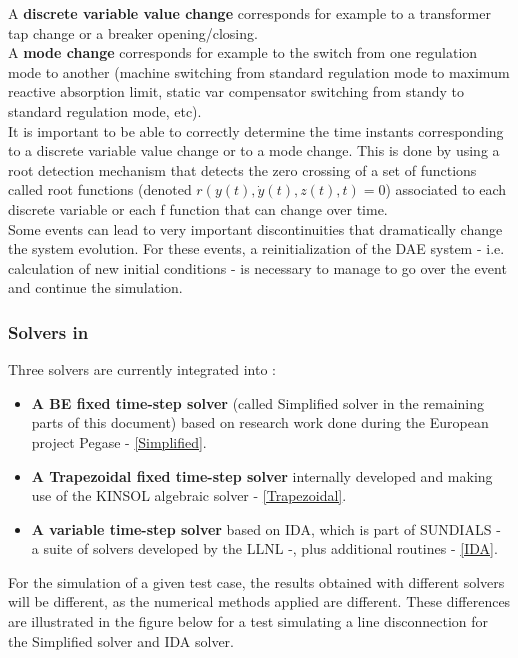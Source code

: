\documentclass[a4paper, 12pt]{report}
\begin{document}
A \textbf{discrete variable value change} corresponds for example to a transformer tap change or a breaker opening/closing. \\

A \textbf{mode change} corresponds for example to the switch from one regulation mode to another (machine switching from standard regulation mode to maximum reactive absorption limit, static var compensator switching from standy to standard regulation mode, etc). \\

It is important to be able to correctly determine the time instants corresponding to a discrete variable value change or to a mode change. This is done by using a root detection mechanism that detects the zero crossing of a set of functions called root functions (denoted $r(y(t), \dot{y}(t), z(t), t) = 0$) associated to each discrete variable or each f function that can change over time. \\

Some events can lead to very important discontinuities that dramatically change the system evolution. For these events, a reinitialization of the \ac{DAE} system - i.e. calculation of new initial conditions - is necessary to manage to go over the event and continue the simulation. \\

\subsubsection[Solvers in Dynawo]{Solvers in \Dynawo}

Three solvers are currently integrated into \Dynawo:
\begin{itemize}
\item \textbf{A \ac{BE} fixed time-step solver} (called Simplified solver in the remaining parts of this document) based on research work done during the European project Pegase \cite{Pegase_Report, Pegase_Events, Pegase_IEEE_GM} - \ref{Simplified}.
\item \textbf{A Trapezoidal fixed time-step solver} internally developed and making use of the \ac{KINSOL} algebraic solver - \ref{Trapezoidal}.
\item \textbf{A variable time-step solver} based on IDA, which is part of \ac{SUNDIALS} - a suite of solvers developed by the \ac{LLNL} -, plus additional routines \cite{hindmarsh2005sundials} - \ref{IDA}.
\end{itemize}

For the simulation of a given test case, the results obtained with different solvers will be different, as the numerical methods applied are different. These differences are illustrated in the figure below for a test simulating a line disconnection for the Simplified solver and IDA solver.
\end{document}
